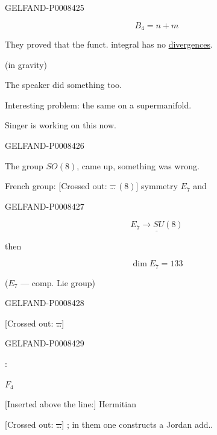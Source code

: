 \begin{GelfandAdjacentEvidence}{GELFAND-P000842}{5}


\[
B_4=n+m
\]

They proved that the funct. integral has no \uline{divergences}.

(in gravity)

The speaker did something too.

Interesting problem: the same on a supermanifold.

Singer is working on this now.

\end{GelfandAdjacentEvidence}
\begin{GelfandAdjacentEvidence}{GELFAND-P000842}{6}


The group \(SO(8)\), came up, something was wrong.

French group: [Crossed out: \sout{…}\,\((8)\)] symmetry \(E_7\) and
\end{GelfandAdjacentEvidence}
\begin{GelfandAdjacentEvidence}{GELFAND-P000842}{7}

\[
\underline{E_7\longrightarrow SU(8)}
\]

then 

\[
\dim E_7=133
\]

(\(E_7\) — comp. Lie group)
\end{GelfandAdjacentEvidence}
\begin{GelfandAdjacentEvidence}{GELFAND-P000842}{8}



[Crossed out: \sout{…}] 
\end{GelfandAdjacentEvidence}
\begin{GelfandAdjacentEvidence}{GELFAND-P000842}{9}


:

\(F_4\)

[Inserted above the line:] Hermitian

[Crossed out: \sout{…}] ; in them one constructs a Jordan add..
\end{GelfandAdjacentEvidence}
